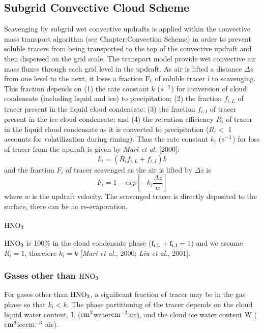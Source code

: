 \subsection{Subgrid Convective Cloud Scheme}
Scavenging by subgrid wet convective updrafts is applied within the 
convective mass transport algorithm (see Chapter:Convection Scheme) in 
order to prevent soluble tracers from being transported to the top of the 
convective updraft and then dispersed on the grid scale. The transport model 
provide wet convective air mass fluxes through each grid level in the 
updraft. As air is lifted a distance $\Delta z$ from one level to the next, 
it loses a fraction $\rm F_i$ of soluble tracer i to scavenging. This 
fraction depends on (1) the rate constant $k$ ($\rm s^{-1}$) for conversion 
of cloud condensate (including liquid and ice) to precipitation; 
(2) the fraction $f_{i,L}$ of tracer present in the liquid cloud condensate; 
(3) the fraction $f_{i,I}$ of tracer present in the ice cloud condensate; 
and (4) the retention efficiency $R_i$ of tracer in the liquid cloud condensate
as it is converted to precipitation ($R_i <$ 1 accounts for volatilization 
during riming). Thus the rate constant $k_i$ ($\rm s^{-1}$) for loss of 
tracer from the updraft is given by {\it Mari et al.} [2000]:
$$
k_i = (R_i f_{i,L} + f_{i,I}) k
$$
and the fraction $F_i$ of tracer scavenged as the air is lifted by $\Delta z$ 
is
$$
F_i = 1 - exp\left[ -k_i \frac{\Delta z}{w} \right]
$$
where $w$ is the updraft velocity. The scavenged tracer is directly deposited 
to the surface, there can be no re-evaporation.
\subsubsection{$\rm HNO_3$} 
$\rm HNO_3$ is 100\% in the cloud condensate phase ($\rm f_{i,L} + f_{i,I}=1$) 
and we assume $R_i = 1$, therefore $k_i = k$ [{\it Mari et al.}, 2000; {\it Liu et al.}, 2001].
\subsubsection{Gases other than $\rm HNO_3$} 
For gases other than $\rm HNO_3$, a significant fraction of tracer may be in 
the gas phase so that $k_i < k$. The phase partitioning of the tracer depends 
on the cloud liquid water content, L ($\rm cm^3$water$\rm cm^{-3}$air), and the 
cloud ice water content W ($\rm cm^3$ice$\rm cm^{-3}$ air). 

